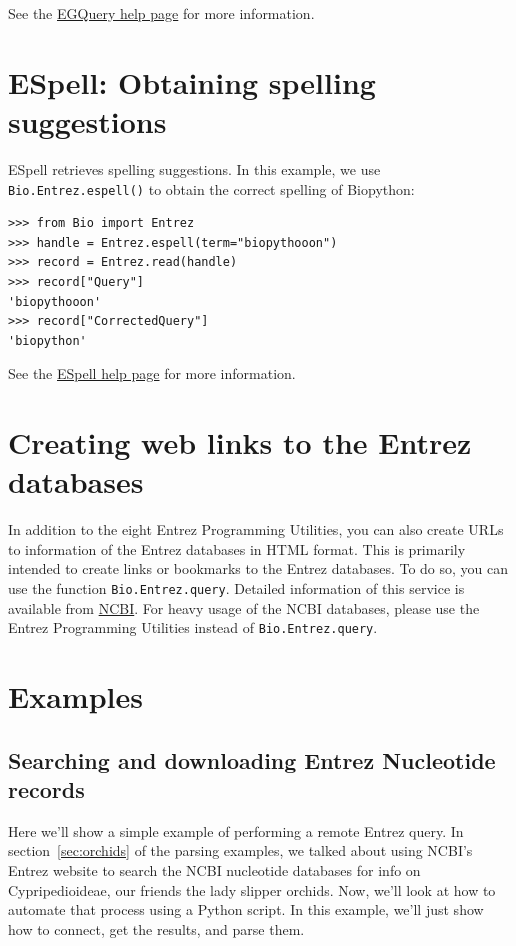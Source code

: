 \documentclass{report}
\begin{document}
See the \href{http://www.ncbi.nlm.nih.gov/entrez/query/static/egquery\_help.html}{EGQuery help page} for more information.

\section{ESpell: Obtaining spelling suggestions}
ESpell retrieves spelling suggestions. In this example, we use \verb+Bio.Entrez.espell()+ to obtain the correct spelling of Biopython:

\begin{verbatim}
>>> from Bio import Entrez
>>> handle = Entrez.espell(term="biopythooon")
>>> record = Entrez.read(handle)
>>> record["Query"]
'biopythooon'
>>> record["CorrectedQuery"]
'biopython'
\end{verbatim}
See the \href{http://www.ncbi.nlm.nih.gov/entrez/query/static/espell\_help.html}{ESpell help page} for more information.

\section{Creating web links to the Entrez databases}

In addition to the eight Entrez Programming Utilities, you can also create URLs to information of the Entrez databases in HTML format. This is primarily intended to create links or bookmarks to the Entrez databases. To do so, you can use the function \verb+Bio.Entrez.query+. Detailed information of this service is available from \href{http://www.ncbi.nlm.nih.gov/books/bv.fcgi?rid=helplinks.chapter.linkshelp}{NCBI}. For heavy usage of the NCBI databases, please use the Entrez Programming Utilities instead of \verb+Bio.Entrez.query+.

\section{Examples}
\label{sec:entrez_examples}

\subsection{Searching and downloading Entrez Nucleotide records}

Here we'll show a simple example of performing a remote Entrez query. In section~\ref{sec:orchids} of the parsing examples, we talked about using NCBI's Entrez website to search the NCBI nucleotide databases for info on Cypripedioideae, our friends the lady slipper orchids. Now, we'll look at how to automate that process using a Python script. In this example, we'll just show how to connect, get the results, and parse them.
\end{document}
